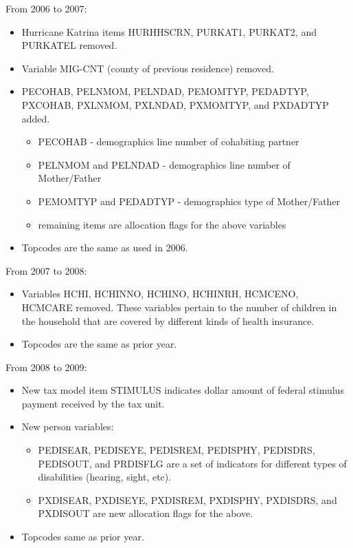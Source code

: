 \documentclass{article}
\begin{document}
From 2006 to 2007:
\begin{itemize}
	\item Hurricane Katrina items HURHHSCRN, PURKAT1, PURKAT2, and PURKATEL removed.
	\item Variable MIG-CNT (county of previous residence) removed.
	\item PECOHAB, PELNMOM, PELNDAD, PEMOMTYP, PEDADTYP, PXCOHAB, PXLNMOM, PXLNDAD, PXMOMTYP, and PXDADTYP added.
	\begin{itemize}
		\item PECOHAB - demographics line number of cohabiting partner
		\item PELNMOM and PELNDAD - demographics line number of Mother/Father
		\item{PEMOMTYP and PEDADTYP - demographics type of Mother/Father}
		\item remaining items are allocation flags for the above variables
	\end{itemize}
	\item Topcodes are the same as used in 2006. 
\end{itemize}
	
From 2007 to 2008:
\begin{itemize}
	\item Variables HCHI, HCHINNO, HCHINO, HCHINRH,
	HCMCENO, HCMCARE removed. These variables pertain to the number of children in the household that are covered by different kinds of health insurance.
	\item Topcodes are the same as prior year.
\end{itemize}

From 2008 to 2009:
\begin{itemize}
	\item New tax model item STIMULUS indicates dollar amount of federal stimulus payment received by the tax unit.
	\item New person variables:
	\begin{itemize}
		\item PEDISEAR, PEDISEYE, PEDISREM,  PEDISPHY, PEDISDRS, PEDISOUT, and PRDISFLG are a set of indicators for different types of disabilities (hearing, sight, etc).
		\item PXDISEAR, PXDISEYE, PXDISREM, PXDISPHY, PXDISDRS, and PXDISOUT are new allocation flags for the above. 
	\end{itemize}
\item Topcodes same as prior year.
\end{itemize}
	
\end{document}
